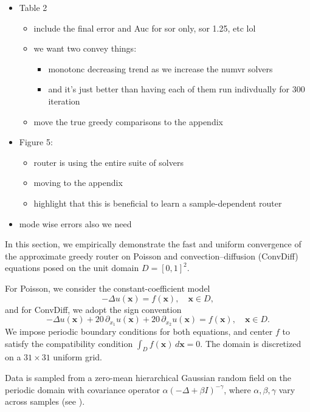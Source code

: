 \documentclass{article}
\begin{document}
\begin{itemize}
    \item Table 2
    \begin{itemize}
        \item include the final error and Auc for sor only, sor 1.25, etc lol
        \item we want two convey things:
        \begin{itemize}
            \item monotonc decreasing trend as we increase the numvr solvers
            \item and it's just better than having each of them run indivdually for 300 iteration
        \end{itemize}
        \item move the true greedy comparisons to the appendix
    \end{itemize}
    \item Figure 5:
    \begin{itemize}
        \item router is using the entire suite of solvers
        \item moving to the appendix
        \item highlight that this is beneficial to learn a sample-dependent router
    \end{itemize}
    \item mode wise errors also we need
    
\end{itemize}


In this section, we empirically demonstrate the fast and uniform convergence of the approximate greedy router on Poisson and convection–diffusion (ConvDiff) equations posed on the unit domain $D = [0,1]^2$.

For Poisson, we consider the constant-coefficient model
\begin{equation*}
    - \Delta u(\mathbf{x}) = f(\mathbf{x}), \quad \mathbf{x}\in D,
\end{equation*}
and for ConvDiff, we adopt the sign convention
\begin{equation*}
    -\Delta u(\mathbf{x}) + 20\,\partial_{x_1}u(\mathbf{x}) + 20\,\partial_{x_2}u(\mathbf{x}) = f(\mathbf{x}), \quad \mathbf{x}\in D.
\end{equation*}
We impose periodic boundary conditions for both equations, and center $f$ to satisfy the compatibility condition $\int_D f(\mathbf{x})\,d\mathbf{x} = 0$. The domain is discretized on a $31\times31$ uniform grid.

Data is sampled from a zero-mean hierarchical Gaussian random field on the periodic domain with covariance operator $\alpha(-\Delta + \beta I)^{-\gamma}$, where $\alpha,\beta,\gamma$ vary across samples (see ).
\end{document}
